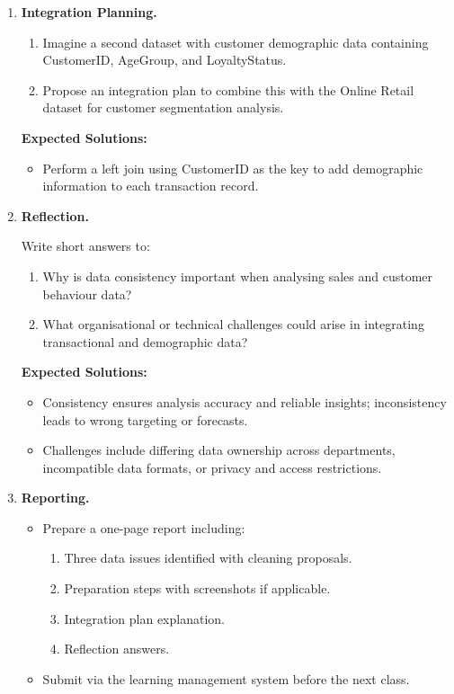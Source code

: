 \begin{enumerate}
	\item \textbf{Integration Planning.}
	
	\begin{enumerate}
		\item Imagine a second dataset with customer demographic data containing CustomerID, AgeGroup, and LoyaltyStatus.
		\item Propose an integration plan to combine this with the Online Retail dataset for customer segmentation analysis.
	\end{enumerate}
	
	\textbf{Expected Solutions:}
	
	\begin{itemize}
		\item Perform a left join using CustomerID as the key to add demographic information to each transaction record.
	\end{itemize}
	
	\item \textbf{Reflection.}
	
	Write short answers to:
	
	\begin{enumerate}
		\item Why is data consistency important when analysing sales and customer behaviour data?
		\item What organisational or technical challenges could arise in integrating transactional and demographic data?
	\end{enumerate}
	
	\textbf{Expected Solutions:}
	
	\begin{itemize}
		\item Consistency ensures analysis accuracy and reliable insights; inconsistency leads to wrong targeting or forecasts.
		\item Challenges include differing data ownership across departments, incompatible data formats, or privacy and access restrictions.
	\end{itemize}
	
	\item \textbf{Reporting.}
	
	\begin{itemize}
		\item Prepare a one-page report including:
		\begin{enumerate}
			\item Three data issues identified with cleaning proposals.
			\item Preparation steps with screenshots if applicable.
			\item Integration plan explanation.
			\item Reflection answers.
		\end{enumerate}
		\item Submit via the learning management system before the next class.
	\end{itemize}
\end{enumerate}


